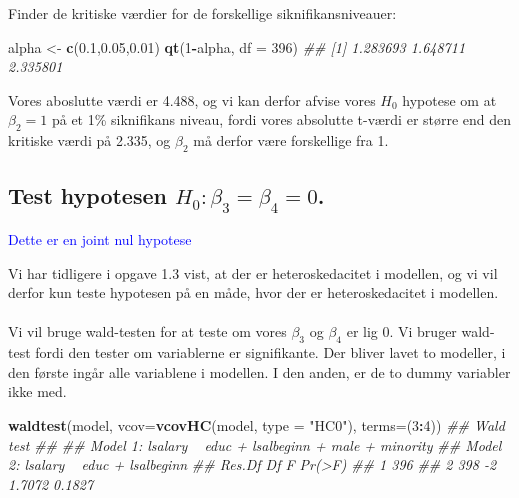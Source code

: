 \documentclass[
  10pt,
]{article}
\newenvironment{Shaded}{\begin{snugshade}}{\end{snugshade}}
\newcommand{\CommentTok}[1]{\textcolor[rgb]{0.56,0.35,0.01}{\textit{#1}}}
\newcommand{\DataTypeTok}[1]{\textcolor[rgb]{0.13,0.29,0.53}{#1}}
\newcommand{\DecValTok}[1]{\textcolor[rgb]{0.00,0.00,0.81}{#1}}
\newcommand{\FloatTok}[1]{\textcolor[rgb]{0.00,0.00,0.81}{#1}}
\newcommand{\KeywordTok}[1]{\textcolor[rgb]{0.13,0.29,0.53}{\textbf{#1}}}
\newcommand{\NormalTok}[1]{#1}
\newcommand{\OperatorTok}[1]{\textcolor[rgb]{0.81,0.36,0.00}{\textbf{#1}}}
\newcommand{\StringTok}[1]{\textcolor[rgb]{0.31,0.60,0.02}{#1}}
\begin{document}
Finder de kritiske værdier for de forskellige siknifikansniveauer:

\begin{Shaded}
\begin{Highlighting}[]
\NormalTok{alpha <-}\StringTok{ }\KeywordTok{c}\NormalTok{(}\FloatTok{0.1}\NormalTok{,}\FloatTok{0.05}\NormalTok{,}\FloatTok{0.01}\NormalTok{)}
\KeywordTok{qt}\NormalTok{(}\DecValTok{1}\OperatorTok{-}\NormalTok{alpha, }\DataTypeTok{df =} \DecValTok{396}\NormalTok{)}
\CommentTok{## [1] 1.283693 1.648711 2.335801}
\end{Highlighting}
\end{Shaded}

Vores aboslutte værdi er 4.488, og vi kan derfor afvise vores \(H_0\)
hypotese om at \(\beta_2 = 1\) på et 1\% siknifikans niveau, fordi vores
absolutte t-værdi er større end den kritiske værdi på 2.335, og
\(\beta_2\) må derfor være forskellige fra 1. \newpage

\hypertarget{test-hypotesen-h_0-beta_3-beta_4-0.}{%
\subsection{\texorpdfstring{Test hypotesen
\(H_0 : \beta_3 = \beta_4 = 0\).}{Test hypotesen H\_0 : \textbackslash beta\_3 = \textbackslash beta\_4 = 0.}}\label{test-hypotesen-h_0-beta_3-beta_4-0.}}

\textcolor{blue}{Dette er en joint nul hypotese}

Vi har tidligere i opgave 1.3 vist, at der er heteroskedacitet i
modellen, og vi vil derfor kun teste hypotesen på en måde, hvor der er
heteroskedacitet i modellen.\\
~\\
Vi vil bruge wald-testen for at teste om vores \(\beta_3\) og
\(\beta_4\) er lig 0. Vi bruger wald-test fordi den tester om
variablerne er signifikante. Der bliver lavet to modeller, i den første
ingår alle variablene i modellen. I den anden, er de to dummy variabler
ikke med.

\begin{Shaded}
\begin{Highlighting}[]
\KeywordTok{waldtest}\NormalTok{(model, }\DataTypeTok{vcov=}\KeywordTok{vcovHC}\NormalTok{(model, }\DataTypeTok{type =} \StringTok{"HC0"}\NormalTok{), }\DataTypeTok{terms=}\NormalTok{(}\DecValTok{3}\OperatorTok{:}\DecValTok{4}\NormalTok{))}
\CommentTok{## Wald test}
\CommentTok{## }
\CommentTok{## Model 1: lsalary ~ educ + lsalbeginn + male + minority}
\CommentTok{## Model 2: lsalary ~ educ + lsalbeginn}
\CommentTok{##   Res.Df Df      F Pr(>F)}
\CommentTok{## 1    396                 }
\CommentTok{## 2    398 -2 1.7072 0.1827}
\end{Highlighting}
\end{Shaded}
\end{document}
